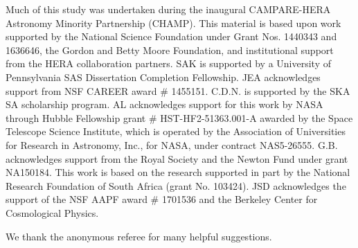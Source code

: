 \documentclass[twocolumn, trackchanges]{aastex61}
\begin{document}
Much of this study was undertaken during the inaugural CAMPARE-HERA Astronomy Minority Partnership (CHAMP).
This material is based upon work supported by the National Science Foundation under Grant Nos. 1440343 and 1636646, the Gordon and Betty Moore Foundation, and institutional support from the HERA collaboration partners.
SAK is supported by a University of Pennsylvania SAS Dissertation Completion Fellowship.
JEA acknowledges support from NSF CAREER award \# 1455151.
C.D.N. is supported by the SKA SA scholarship program.
AL acknowledges support for this work by NASA through Hubble Fellowship grant \# HST-HF2-51363.001-A awarded by the Space Telescope Science Institute, which is operated by the Association of Universities for Research in Astronomy, Inc., for NASA, under contract NAS5-26555.
G.B. acknowledges support from the Royal Society and the Newton Fund under grant NA150184. This work is based on the research supported in part by the National Research Foundation of South Africa (grant No. 103424).
JSD acknowledges the support of the NSF AAPF award \# 1701536 and the Berkeley Center for Cosmological Physics.

We thank the anonymous referee for many helpful suggestions.


\clearpage



\end{document}
